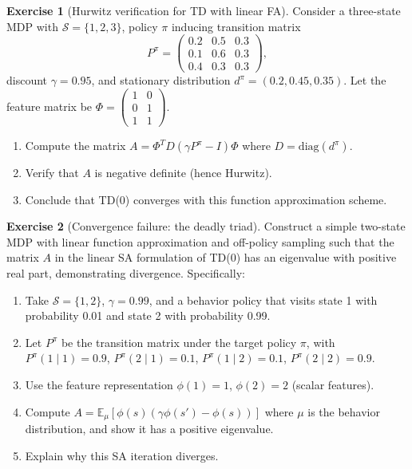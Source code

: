 \documentclass[11pt,a4paper]{article}
\theoremstyle{definition}
\newtheorem{exercise}{Exercise}[section]
\theoremstyle{plain}
\theoremstyle{remark}
\newcommand{\E}{\mathbb{E}}
\begin{document}
\begin{exercise}[Hurwitz verification for TD with linear FA]
\label{ex:hurwitz-td}
Consider a three-state MDP with $\mathcal{S} = \{1, 2, 3\}$, policy $\pi$ inducing
transition matrix
\[
  P^\pi = \begin{pmatrix} 0.2 & 0.5 & 0.3 \\ 0.1 & 0.6 & 0.3 \\ 0.4 & 0.3 & 0.3 \end{pmatrix},
\]
discount $\gamma = 0.95$, and stationary distribution $d^\pi = (0.2, 0.45, 0.35)$.
Let the feature matrix be $\Phi = \begin{pmatrix} 1 & 0 \\ 0 & 1 \\ 1 & 1 \end{pmatrix}$.
\begin{enumerate}[label=(\alph*)]
\item Compute the matrix $A = \Phi^T D(\gamma P^\pi - I)\Phi$ where
  $D = \mathrm{diag}(d^\pi)$.
\item Verify that $A$ is negative definite (hence Hurwitz).
\item Conclude that TD(0) converges with this function approximation scheme.
\end{enumerate}
\end{exercise}

\begin{exercise}[Convergence failure: the deadly triad]
\label{ex:deadly-triad}
Construct a simple two-state MDP with linear function approximation and off-policy
sampling such that the matrix $A$ in the linear SA formulation of TD(0) has an
eigenvalue with positive real part, demonstrating divergence. Specifically:
\begin{enumerate}[label=(\alph*)]
\item Take $\mathcal{S} = \{1, 2\}$, $\gamma = 0.99$, and a behavior policy that
  visits state 1 with probability 0.01 and state 2 with probability 0.99.
\item Let $P^\pi$ be the transition matrix under the target policy $\pi$, with
  $P^\pi(1 \mid 1) = 0.9$, $P^\pi(2 \mid 1) = 0.1$, $P^\pi(1 \mid 2) = 0.1$,
  $P^\pi(2 \mid 2) = 0.9$.
\item Use the feature representation $\phi(1) = 1$, $\phi(2) = 2$ (scalar features).
\item Compute $A = \E_\mu[\phi(s)(\gamma\phi(s') - \phi(s))]$ where $\mu$ is the
  behavior distribution, and show it has a positive eigenvalue.
\item Explain why this SA iteration diverges.
\end{enumerate}
\end{exercise}
\end{document}
